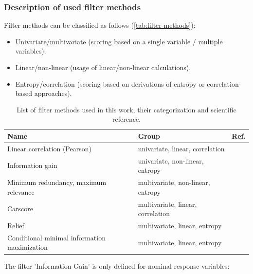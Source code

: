 \documentclass[remotesensing,article,submit,moreauthors,pdftex]{Definitions/mdpi}
\begin{document}
\subsubsection{Description of used filter methods}

Filter methods can be classified as follows (\autoref{tab:filter-methods}):

\begin{itemize}
	\item Univariate/multivariate (scoring based on a single variable / multiple variables).
	\item Linear/non-linear (usage of linear/non-linear calculations).
	\item Entropy/correlation (scoring based on derivations of entropy or correlation-based approaches).
\end{itemize}

\begin{table}[b!]
	\centering
	\caption{List of filter methods used in this work, their categorization and scientific reference.}
	\label{tab:filter-methods}
	\begingroup\footnotesize
	\begin{adjustbox}{width={0.7\textwidth},totalheight={\textheight},keepaspectratio}
		\begin{tabular}{lll}
			\\
			Name                                         & Group                             & Ref.               \\
			\toprule
			Linear correlation (Pearson)                 & univariate, linear, correlation   & \cite{pearson1901} \\
			Information gain                             & univariate, non-linear, entropy   & \cite{quinlan1986} \\
			Minimum redundancy, maximum relevance        & multivariate, non-linear, entropy & \cite{zhao2013}    \\
			Carscore                                     & multivariate, linear, correlation & \cite{zuber2011}   \\
			Relief                                       & multivariate, linear, entropy     & \cite{kira1992}    \\
			Conditional minimal information maximization & multivariate, linear, entropy     & \cite{fleuret2004}
		\end{tabular}
	\end{adjustbox}
	\endgroup
\end{table}

The filter 'Information Gain' is only defined for nominal response variables:
\end{document}
